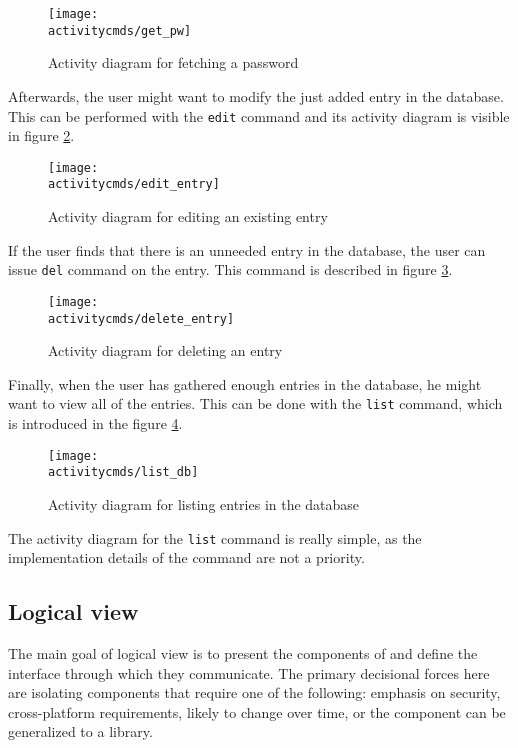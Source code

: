 \begin{figure}[H]
    \centering
    \centerline{\texttt{[image: \\activitycmds/get\_pw]}}
    \caption{Activity diagram for fetching a password}
    \label{dia:get_pw}
\end{figure}

Afterwards, the user might want to modify the just added entry in the database.
This can be performed with the \texttt{edit} command and its activity diagram
is visible in figure \ref{dia:edit_entry}.

\begin{figure}[H]
    \centering
    \centerline{\texttt{[image: \\activitycmds/edit\_entry]}}
    \caption{Activity diagram for editing an existing entry}
    \label{dia:edit_entry}
\end{figure}

If the user finds that there is an unneeded entry in the database, the user can
issue \texttt{del} command on the entry. This command is described in figure
\ref{dia:delete_entry}.

\begin{figure}[H]
    \centering
    \centerline{\texttt{[image: \\activitycmds/delete\_entry]}}
    \caption{Activity diagram for deleting an entry}
    \label{dia:delete_entry}
\end{figure}

Finally, when the user has gathered enough entries in the database, he might
want to view all of the entries. This can be done with the \texttt{list} command,
which is introduced in the figure \ref{dia:list_db}.

\begin{figure}[H]
    \centering
    \centerline{\texttt{[image: \\activitycmds/list\_db]}}
    \caption{Activity diagram for listing entries in the database}
    \label{dia:list_db}
\end{figure}

The activity diagram for the \texttt{list} command is really simple, as the
implementation details of the command are not a priority.

\subsection{Logical view}

The main goal of logical view is to present the components of \pman and define
the interface through which they communicate. The primary decisional forces
here are isolating components that require one of the following: emphasis on
security, cross-platform requirements, likely to change over time, or the
component can be generalized to a library.

